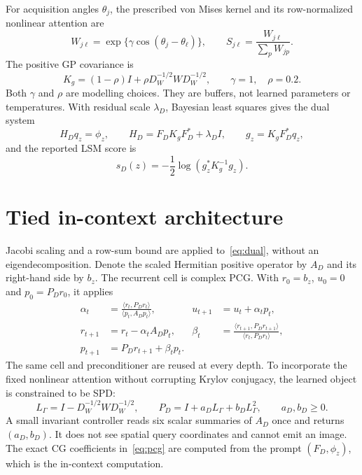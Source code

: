 \documentclass[10pt]{article}
\begin{document}
For acquisition angles $\theta_j$, the prescribed von Mises kernel and its
row-normalized nonlinear attention are
\begin{equation}
 W_{j\ell}=\exp\{\gamma\cos(\theta_j-\theta_\ell)\},
 \qquad S_{j\ell}=\frac{W_{j\ell}}{\sum_p W_{jp}}.
 \label{eq:softmax}
\end{equation}
The positive GP covariance is
\begin{equation}
 K_g=(1-\rho)I+\rho D_W^{-1/2}WD_W^{-1/2},
 \qquad \gamma=1,\quad \rho=0.2.
 \label{eq:prior}
\end{equation}
Both $\gamma$ and $\rho$ are modelling choices.  They are buffers, not learned
parameters or temperatures.  With residual scale $\lambda_D$, Bayesian least
squares gives the dual system
\begin{equation}
 H_Dq_z=\phi_z,\qquad
 H_D=F_DK_gF_D^*+\lambda_DI,\qquad
 g_z=K_gF_D^*q_z,
 \label{eq:dual}
\end{equation}
and the reported LSM score is
\begin{equation}
 s_D(z)=-\frac12\log\!\left(g_z^*K_g^{-1}g_z\right).
 \label{eq:indicator}
\end{equation}

\section{Tied in-context architecture}

Jacobi scaling and a row-sum bound are applied to~\eqref{eq:dual}, without an
eigendecomposition.  Denote the scaled Hermitian positive operator by $A_D$
and its right-hand side by $b_z$.  The recurrent cell is complex PCG.  With
$r_0=b_z$, $u_0=0$ and $p_0=P_Dr_0$, it applies
\begin{align}
 \alpha_t&=\frac{\langle r_t,P_Dr_t\rangle}
 {\langle p_t,A_Dp_t\rangle},
 &u_{t+1}&=u_t+\alpha_tp_t,\\
 r_{t+1}&=r_t-\alpha_tA_Dp_t,
 &\beta_t&=\frac{\langle r_{t+1},P_Dr_{t+1}\rangle}
 {\langle r_t,P_Dr_t\rangle},\\
 p_{t+1}&=P_Dr_{t+1}+\beta_tp_t.&&
 \label{eq:pcg}
\end{align}
The same cell and preconditioner are reused at every depth.  To incorporate the
fixed nonlinear attention without corrupting Krylov conjugacy, the learned
object is constrained to be SPD:
\begin{equation}
 L_\Gamma=I-D_W^{-1/2}WD_W^{-1/2},\qquad
 P_D=I+a_DL_\Gamma+b_DL_\Gamma^2,\qquad a_D,b_D\ge0.
 \label{eq:preconditioner}
\end{equation}
A small invariant controller reads six scalar summaries of $A_D$ once and
returns $(a_D,b_D)$.  It does not see spatial query coordinates and cannot emit
an image.  The exact CG coefficients in~\eqref{eq:pcg} are computed from the
prompt $(F_D,\phi_z)$, which is the in-context computation.
\end{document}
